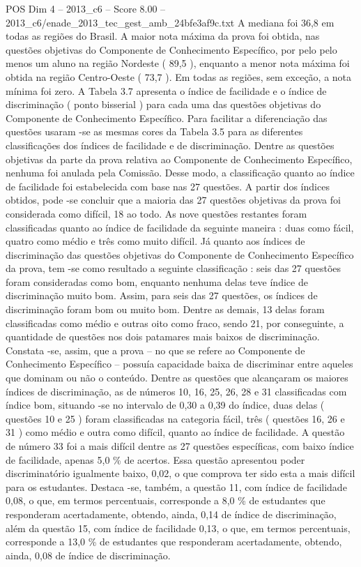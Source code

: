 \begin{textsample}{POS Dim 4 – 2013\_c6 – Score 8.00 – 2013\_c6/enade\_2013\_tec\_gest\_amb\_24bfe3af9c.txt}
A mediana foi 36,8 em todas as regiões do Brasil.
A maior nota máxima da prova foi obtida, nas questões objetivas do Componente de Conhecimento Específico, por pelo pelo menos um aluno na região Nordeste ( 89,5 ), enquanto a menor nota máxima foi obtida na região Centro-Oeste ( 73,7 ).
Em todas as regiões, sem exceção, a nota mínima foi zero.
A Tabela 3.7 apresenta o índice de facilidade e o índice de discriminação ( ponto bisserial ) para cada uma das questões objetivas do Componente de Conhecimento Específico.
Para facilitar a diferenciação das questões usaram -se as mesmas cores da Tabela 3.5 para as diferentes classificações dos índices de facilidade e de discriminação.
Dentre as questões objetivas da parte da prova relativa ao Componente de Conhecimento Específico, nenhuma foi anulada pela Comissão.
Desse modo, a classificação quanto ao índice de facilidade foi estabelecida com base nas 27 questões.
A partir dos índices obtidos, pode -se concluir que a maioria das 27 questões objetivas da prova foi considerada como difícil, 18 ao todo.
As nove questões restantes foram classificadas quanto ao índice de facilidade da seguinte maneira : duas como fácil, quatro como médio e três como muito difícil.
Já quanto aos índices de discriminação das questões objetivas do Componente de Conhecimento Específico da prova, tem -se como resultado a seguinte classificação : seis das 27 questões foram consideradas como bom, enquanto nenhuma delas teve índice de discriminação muito bom.
Assim, para seis das 27 questões, os índices de discriminação foram bom ou muito bom.
Dentre as demais, 13 delas foram classificadas como médio e outras oito como fraco, sendo 21, por conseguinte, a quantidade de questões nos dois patamares mais baixos de discriminação.
Constata -se, assim, que a prova – no que se refere ao Componente de Conhecimento Específico – possuía capacidade baixa de discriminar entre aqueles que dominam ou não o conteúdo.
Dentre as questões que alcançaram os maiores índices de discriminação, as de números 10, 16, 25, 26, 28 e 31 classificadas com índice bom, situando -se no intervalo de 0,30 a 0,39 do índice, duas delas ( questões 10 e 25 ) foram classificadas na categoria fácil, três ( questões 16, 26 e 31 ) como médio e outra como difícil, quanto ao índice de facilidade.
A questão de número 33 foi a mais difícil dentre as 27 questões específicas, com baixo índice de facilidade, apenas 5,0 \% de acertos.
Essa questão apresentou poder discriminatório igualmente baixo, 0,02, o que comprova ter sido esta a mais difícil para os estudantes.
Destaca -se, também, a questão 11, com índice de facilidade 0,08, o que, em termos percentuais, corresponde a 8,0 \% de estudantes que responderam acertadamente, obtendo, ainda, 0,14 de índice de discriminação, além da questão 15, com índice de facilidade 0,13, o que, em termos percentuais, corresponde a 13,0 \% de estudantes que responderam acertadamente, obtendo, ainda, 0,08 de índice de discriminação.

\end{textsample}
